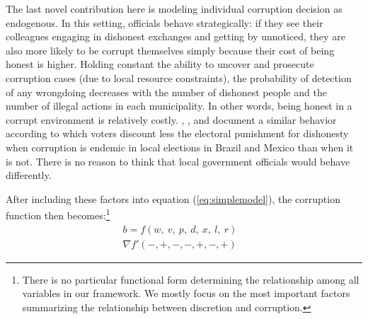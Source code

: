 \documentclass[11pt]{article}
\begin{document}
The last novel contribution here is modeling individual corruption decision as endogenous. In this setting, officials behave strategically: if they see their colleagues engaging in dishonest exchanges and getting by unnoticed, they are also more likely to be corrupt themselves simply because their cost of being honest is higher. Holding constant the ability to uncover and prosecute corruption cases (due to local resource constraints), the probability of detection of any wrongdoing decreases with the number of dishonest people and the number of illegal actions in each municipality. In other words, being honest in a corrupt environment is relatively costly. \citet{FerrazExposingCorruptPoliticians2008b}, \citet{WintersLackingInformationCondoning2013}, and \citet{ChongDoesCorruptionInformation2015} document a similar behavior according to which voters discount less the electoral punishment for dishonesty when corruption is endemic in local elections in Brazil and Mexico than when it is not. There is no reason to think that local government officials would behave differently.

After including these factors into equation (\ref{eq:simplemodel}), the corruption function then becomes:\footnote{There is no particular functional form determining the relationship among all variables in our framework. We mostly focus on the most important factors summarizing the relationship between discretion and corruption.}
\begin{equation} \label{eq:bribefunction}
  \begin{aligned}
    b = f(w,\ v,\ p,\ d,\ x,\ l,\ r)& \\
    \nabla f'(-,+,-,-,+,-,+)&
  \end{aligned}
\end{equation}
\end{document}
